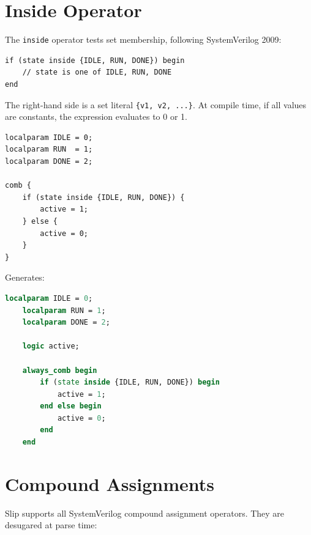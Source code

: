 \documentclass[lang=en,11pt]{elegantbook}
\newcommand{\code}[1]{\texttt{#1}}
\begin{document}
\chapter{Inside Operator}

The \code{inside} operator tests set membership, following SystemVerilog 2009:

\begin{lstlisting}[language=Slip]
if (state inside {IDLE, RUN, DONE}) begin
    // state is one of IDLE, RUN, DONE
end
\end{lstlisting}

The right-hand side is a set literal \code{\{v1, v2, ...\}}. At compile time, if all values are constants, the expression evaluates to 0 or 1.

\begin{lstlisting}[language=Slip]
localparam IDLE = 0;
localparam RUN  = 1;
localparam DONE = 2;

comb {
    if (state inside {IDLE, RUN, DONE}) {
        active = 1;
    } else {
        active = 0;
    }
}
\end{lstlisting}

Generates:

\begin{lstlisting}[language=SystemVerilog]
    localparam IDLE = 0;
    localparam RUN = 1;
    localparam DONE = 2;

    logic active;

    always_comb begin
        if (state inside {IDLE, RUN, DONE}) begin
            active = 1;
        end else begin
            active = 0;
        end
    end
\end{lstlisting}

\chapter{Compound Assignments}

Slip supports all SystemVerilog compound assignment operators. They are desugared at parse time:
\end{document}
